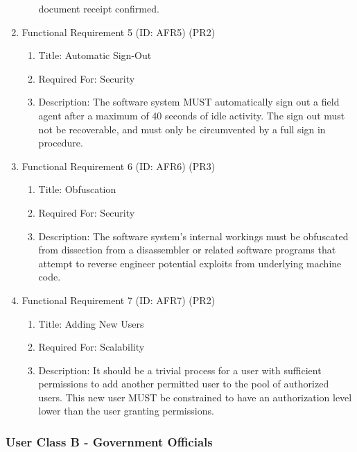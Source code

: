 \documentclass[12pt]{article}
\begin{document}
\begin{enumerate}
\begin{enumerate}
        document receipt confirmed.
    \end{enumerate}
    \item Functional Requirement 5 (ID: AFR5) (PR2)
    \begin{enumerate}
        \item Title: Automatic Sign-Out
        \item Required For: Security
        \item Description: The software system MUST automatically sign out a field agent after a maximum of 40
        seconds of idle activity. The sign out must not be recoverable, and must only be circumvented by a full
        sign in procedure.
    \end{enumerate}
    \item Functional Requirement 6 (ID: AFR6) (PR3)
    \begin{enumerate}
        \item Title: Obfuscation
        \item Required For: Security
        \item Description: The software system’s internal workings must be obfuscated from dissection from a
        disassembler or related software programs that attempt to reverse engineer potential exploits from
        underlying machine code.
    \end{enumerate}
    \item Functional Requirement 7 (ID: AFR7) (PR2)
    \begin{enumerate}
        \item Title: Adding New Users
        \item Required For: Scalability
        \item Description: It should be a trivial process for a user with sufficient permissions to add another
        permitted user to the pool of authorized users. This new user MUST be constrained to have an authorization
        level lower than the user granting permissions.
    \end{enumerate}
\end{enumerate}

\subsubsection{User Class B - Government Officials}
\end{document}
